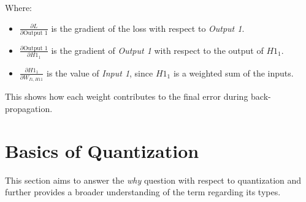 \noindent Where:
\begin{itemize}
    \item \( \frac{\partial L}{\partial \text{Output 1}} \) is the gradient of the loss with respect to \textit{Output 1}.
    \item \( \frac{\partial \text{Output 1}}{\partial H1_1} \) is the gradient of \textit{Output 1} with respect to the output of \( H1_1 \).
    \item \( \frac{\partial H1_1}{\partial W_{I1,H11}} \) is the value of \textit{Input 1}, since \( H1_1 \) is a weighted sum of the inputs.
\end{itemize}

\noindent This shows how each weight contributes to the final error during back-propagation.


\section{Basics of Quantization}
\label{sec:section2}
This section aims to answer the \textit{why} question with respect to quantization and further provides a broader understanding of the term regarding its types.

